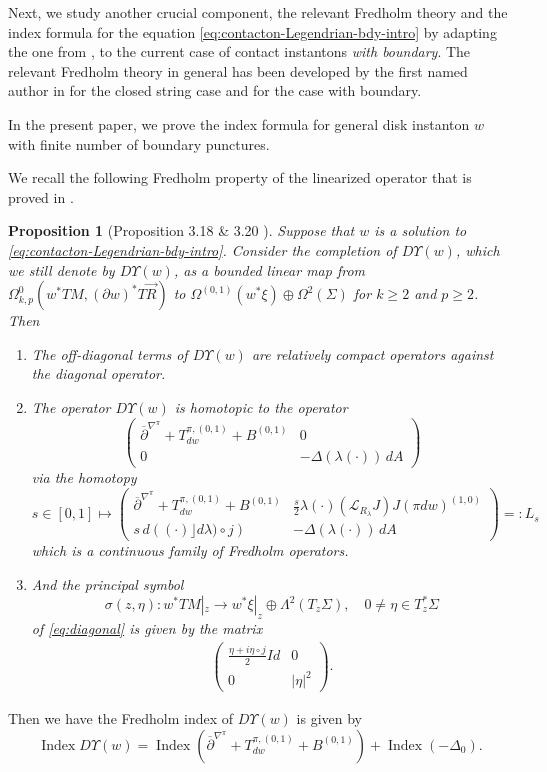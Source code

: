 \documentclass[reqno]{amsart}
\newcommand{\del}{\partial}
\newcommand{\be}{\begin{equation}}
\newcommand{\ee}{\end{equation}}
\newcommand{\beastar}{\begin{eqnarray*}}
\newcommand{\eeastar}{\end{eqnarray*}}
\theoremstyle{theorem}
\newtheorem{prop}[thm]{Proposition}
\theoremstyle{definition}
\numberwithin{equation}{section}
\def\delbar{{\overline \partial}}
\def\delbar{{\overline \partial}}
\def\CL{{\mathcal L}}
\begin{document}
Next, we study another crucial component, the relevant Fredholm theory and the index formula
for the equation \eqref{eq:contacton-Legendrian-bdy-intro}
by adapting the one from \cite{oh:contacton}, \cite{oh-savelyev}
to the current case of contact instantons \emph{with boundary}. The relevant Fredholm theory in general
has been developed  by the first named author in \cite{oh:contacton} for the closed string case and
\cite{oh:contacton-transversality} for the case with boundary.

In the present paper, we prove the index formula for general disk instanton $w$
with finite number of boundary punctures.

We recall  the following Fredholm property of the linearized operator that is proved in
\cite{oh:contacton-transversality}.

\begin{prop}[Proposition 3.18  \& 3.20 \cite{oh:contacton-transversality}] \label{prop:open-fredholm}Suppose that $w$ is a solution to \eqref{eq:contacton-Legendrian-bdy-intro}.
Consider the completion of $D\Upsilon(w)$,
which we still denote by $D\Upsilon(w)$, as a bounded linear map
from $\Omega^0_{k,p}(w^*TM,(\del w)^*T\vec R)$ to
$\Omega^{(0,1)}(w^*\xi)\oplus \Omega^2(\Sigma)$
for $k \geq 2$ and $p \geq 2$. Then
\begin{enumerate}
\item The off-diagonal terms of $D\Upsilon(w)$ are relatively compact operators
against the diagonal operator.
\item
The operator $D\Upsilon(w)$ is homotopic to the operator
\be\label{eq:diagonal}
\left(\begin{matrix}\delbar^{\nabla^\pi} + T_{dw}^{\pi,(0,1)}+ B^{(0,1)} & 0 \\
0 & -\Delta(\lambda(\cdot)) \,dA
\end{matrix}
\right)
\ee
via the homotopy
\be\label{eq:s-homotopy}
s \in [0,1] \mapsto \left(\begin{matrix}\delbar^{\nabla^\pi} + T_{dw}^{\pi,(0,1)} + B^{(0,1)}
& \frac{s}{2} \lambda(\cdot) (\CL_{R_\lambda}J)J (\pi dw)^{(1,0)} \\
s\, d\left((\cdot) \rfloor d\lambda) \circ j\right) & -\Delta(\lambda(\cdot)) \,dA
\end{matrix}
\right) =: L_s
\ee
which is a continuous family of Fredholm operators.
\item And the principal symbol
$$
\sigma(z,\eta): w^*TM|_z \to w^*\xi|_z \oplus \Lambda^2(T_z\Sigma), \quad 0 \neq \eta \in T^*_z\Sigma
$$
of \eqref{eq:diagonal} is given by the matrix
\beastar
\left(\begin{matrix} \frac{\eta + i\eta \circ j}{2} Id  & 0 \\
0 & |\eta|^2
\end{matrix}\right).
\eeastar
\end{enumerate}
\end{prop}
Then we have the Fredholm index of $D\Upsilon(w)$ is given by
$$
\operatorname{Index}D\Upsilon(w) =
\operatorname{Index}(\delbar^{\nabla^\pi} + T_{dw}^{\pi,(0,1)}+ B^{(0,1)}) +
\operatorname{Index}(-\Delta_0).
$$
\end{document}
